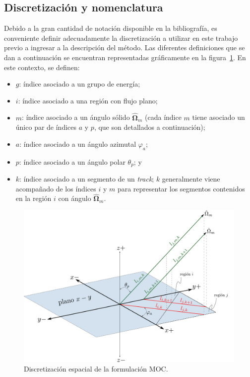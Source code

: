 \documentclass[11pt]{article}
\numberwithin{equation}{section}
\begin{document}
\subsection{Discretización y nomenclatura}

Debido a la gran cantidad de notación disponible en la bibliografía, es conveniente definir adecuadamente la discretización a utilizar en este trabajo previo a ingresar a la descripción del método. Las diferentes definiciones que se dan a continuación se encuentran representadas gráficamente en la figura~\ref{fig:coords-indices}. En este contexto, se definen:

\begin{itemize}
\renewcommand\labelitemi{$\cdot$}
 \item $g$: índice asociado a un grupo de energía;
 \item $i$: índice asociado a una región con flujo plano;
 \item $m$: índice asociado a un ángulo s\'olido $\boldsymbol{\hat{\Omega}}_m$ (cada índice $m$ tiene asociado un único par de índices $a$ y $p$, que son detallados a continuación);
 \item $a$: índice asociado a un ángulo azimutal $\varphi_a$;
 \item $p$: índice asociado a un ángulo polar $\theta_p$; y
 \item $k$: índice asociado a un segmento de un \emph{track}; $k$ generalmente viene acompañado de los índices $i$ y $m$ para representar los segmentos contenidos en la región $i$ con ángulo $\boldsymbol{\hat{\Omega}}_m$.
\end{itemize}

\begin{figure}[!h]
 \begin{center}
  \includegraphics[width=1.0\linewidth]{coords-indices-2.pdf}
 \end{center}
\caption{\label{fig:coords-indices} Discretización espacial de la formulación MOC.}
\end{figure}
\end{document}
